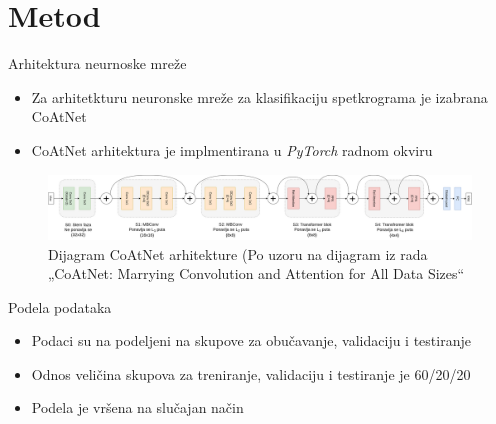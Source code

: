 \documentclass{beamer}
\begin{document}
\section{Metod}
\begin{frame}{Arhitektura neurnoske mreže}
    \begin{itemize}
        \item Za arhitetkturu neuronske mreže za klasifikaciju spetkrograma je izabrana CoAtNet
        \item CoAtNet arhitektura je implmentirana u \textit{PyTorch} radnom okviru
    \end{itemize}
    \begin{figure}
        \centering
        \includegraphics[scale=0.153]{CoAtNet.png}
        \centering
        \captionsetup{justification=centering}
        \caption{Dijagram CoAtNet arhitekture (Po uzoru na dijagram iz rada „CoAtNet: Marrying Convolution and Attention
for All Data Sizes“}
        \label{fig:my_label}
    \end{figure}
\end{frame}
\begin{frame}{Podela podataka}
\begin{itemize}
    \item Podaci su na podeljeni na skupove za obučavanje, validaciju i testiranje
    \item Odnos veličina skupova za treniranje, validaciju i testiranje je 60/20/20
    \item Podela je vršena na slučajan način 
\end{itemize}
\end{frame}
\end{document}
